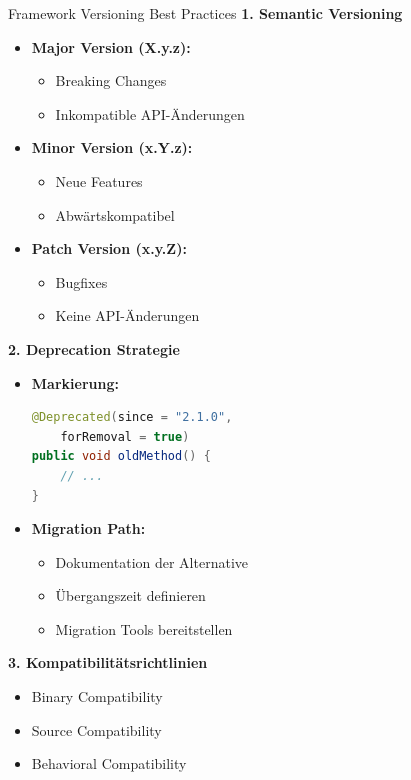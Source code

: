 \begin{KR}{Framework Versioning Best Practices}
\textbf{1. Semantic Versioning}
\begin{itemize}
    \item \textbf{Major Version (X.y.z):}
    \begin{itemize}
        \item Breaking Changes
        \item Inkompatible API-Änderungen
    \end{itemize}
    \item \textbf{Minor Version (x.Y.z):}
    \begin{itemize}
        \item Neue Features
        \item Abwärtskompatibel
    \end{itemize}
    \item \textbf{Patch Version (x.y.Z):}
    \begin{itemize}
        \item Bugfixes
        \item Keine API-Änderungen
    \end{itemize}
\end{itemize}

\textbf{2. Deprecation Strategie}
\begin{itemize}
    \item \textbf{Markierung:}
    \begin{lstlisting}[language=Java, style=base]
@Deprecated(since = "2.1.0", 
    forRemoval = true)
public void oldMethod() {
    // ...
}
    \end{lstlisting}
    \item \textbf{Migration Path:}
    \begin{itemize}
        \item Dokumentation der Alternative
        \item Übergangszeit definieren
        \item Migration Tools bereitstellen
    \end{itemize}
\end{itemize}

\textbf{3. Kompatibilitätsrichtlinien}
\begin{itemize}
    \item Binary Compatibility
    \item Source Compatibility
    \item Behavioral Compatibility
\end{itemize}
\end{KR}

